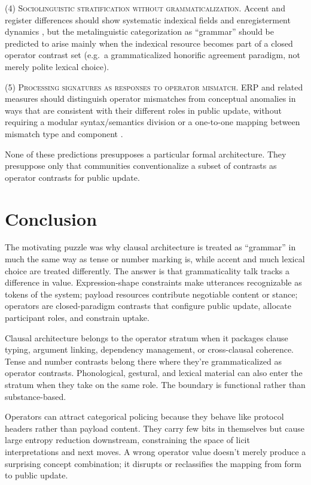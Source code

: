 \documentclass[12pt,letterpaper]{article}
\begin{document}
\textsc{(4) Sociolinguistic stratification without grammaticalization.} Accent and register differences should show systematic indexical fields and enregisterment dynamics \citep{eckert2008,agha2007}, but the metalinguistic categorization as \enquote{grammar} should be predicted to arise mainly when the indexical resource becomes part of a closed operator contrast set (e.g.\ a grammaticalized honorific agreement paradigm, not merely polite lexical choice).

\textsc{(5) Processing signatures as responses to operator mismatch.} ERP and related measures should distinguish operator mismatches from conceptual anomalies in ways that are consistent with their different roles in public update, without requiring a modular syntax/semantics division or a one-to-one mapping between mismatch type and component \citep{kutashillyard1980,osterhoutholcomb1992,friederici2011}.

None of these predictions presupposes a particular formal architecture. They presuppose only that communities conventionalize a subset of contrasts as operator contrasts for public update.

\section{Conclusion}

The motivating puzzle was why clausal architecture is treated as \enquote{grammar} in much the same way as tense or number marking is, while accent and much lexical choice are treated differently. The answer is that grammaticality talk tracks a difference in value. Expression-shape constraints make utterances recognizable as tokens of the system; payload resources contribute negotiable content or stance; operators are closed-paradigm contrasts that configure public update, allocate participant roles, and constrain uptake.

Clausal architecture belongs to the operator stratum when it packages clause typing, argument linking, dependency management, or cross-clausal coherence. Tense and number contrasts belong there where they're grammaticalized as operator contrasts. Phonological, gestural, and lexical material can also enter the stratum when they take on the same role. The boundary is functional rather than substance-based.

Operators can attract categorical policing because they behave like protocol headers rather than payload content. They carry few bits in themselves but cause large entropy reduction downstream, constraining the space of licit interpretations and next moves. A wrong operator value doesn't merely produce a surprising concept combination; it disrupts or reclassifies the mapping from form to public update.
\end{document}
